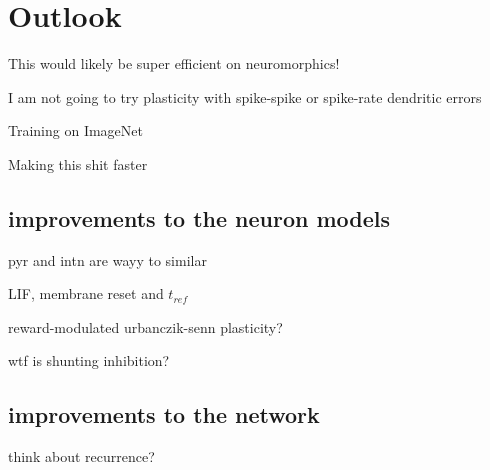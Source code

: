 \section{Outlook}

This would likely be super efficient on neuromorphics!

I am not going to try plasticity with spike-spike or spike-rate dendritic errors

Training on ImageNet

Making this shit faster

\subsection{improvements to the neuron models}



pyr and intn are wayy to similar

LIF, membrane reset and $t_{ref}$ 

reward-modulated urbanczik-senn plasticity?

wtf is shunting inhibition?


\subsection{improvements to the network}

think about recurrence?

